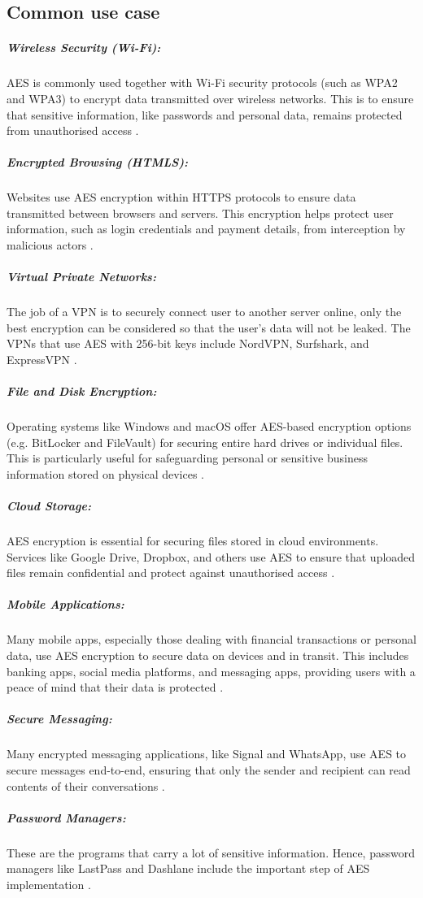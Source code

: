 \subsection{Common use case} 

\subparagraph{Wireless Security (Wi-Fi):} 
AES is commonly used together with Wi-Fi security protocols (such as WPA2 and WPA3) to encrypt data transmitted over wireless networks.
This is to ensure that sensitive information, like passwords and personal data, remains protected from unauthorised access \cite{cooper2025aes}.


\subparagraph{Encrypted Browsing (HTMLS):}
Websites use AES encryption within HTTPS protocols to ensure data transmitted between browsers and servers.
This encryption helps protect user information, such as login credentials and payment details, from interception by malicious actors \cite{cooper2025aes}.


\subparagraph{Virtual Private Networks:}
The job of a \gls{VPN} is to securely connect user to another server online, only the best encryption can be considered so that the user's data will not be leaked.
The \glspl{VPN} that use AES with 256-bit keys include NordVPN, Surfshark, and ExpressVPN \cite{rimkiene2022aes}.


\subparagraph{File and Disk Encryption:}
Operating systems like Windows and macOS offer AES-based encryption options (e.g. BitLocker and FileVault) for securing entire hard drives or individual files.
This is particularly useful for safeguarding personal or sensitive business information stored on physical devices \cite{cooper2025aes}.


\subparagraph{Cloud Storage:}
AES encryption is essential for securing files stored in cloud environments.
Services like Google Drive, Dropbox, and others use AES to ensure that uploaded files remain confidential and protect against unauthorised access \cite{cooper2025aes}.


\subparagraph{Mobile Applications:}
Many mobile apps, especially those dealing with financial transactions or personal data, use AES encryption to secure data on devices and in transit.
This includes banking apps, social media platforms, and messaging apps, providing users with a peace of mind that their data is protected \cite{cooper2025aes}.


\subparagraph{Secure Messaging:}
Many encrypted messaging applications, like Signal and WhatsApp, use AES to secure messages end-to-end, ensuring that only the sender and recipient can read contents of their conversations \cite{cooper2025aes}.


\subparagraph{Password Managers:}
These are the programs that carry a lot of sensitive information.
Hence, password managers like LastPass and Dashlane include the important step of AES implementation \cite{rimkiene2022aes}.